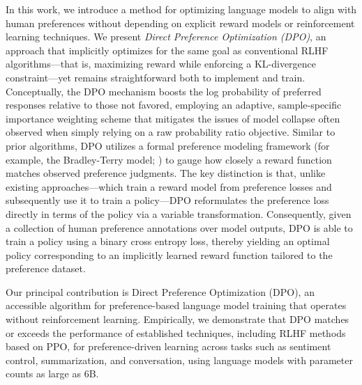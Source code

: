 In this work, we introduce a method for optimizing language models to align with human preferences without depending on explicit reward models or reinforcement learning techniques. We present \textit{{Direct Preference Optimization} (DPO)}, an approach that implicitly optimizes for the same goal as conventional RLHF algorithms—that is, maximizing reward while enforcing a KL-divergence constraint—yet remains straightforward both to implement and train. Conceptually, the DPO mechanism boosts the log probability of preferred responses relative to those not favored, employing an adaptive, sample-specific importance weighting scheme that mitigates the issues of model collapse often observed when simply relying on a raw probability ratio objective. Similar to prior algorithms, DPO utilizes a formal preference modeling framework (for example, the Bradley-Terry model; \cite{bradley1952rankanalysis}) to gauge how closely a reward function matches observed preference judgments. The key distinction is that, unlike existing approaches—which train a reward model from preference losses and subsequently use it to train a policy—DPO reformulates the preference loss directly in terms of the policy via a variable transformation. Consequently, given a collection of human preference annotations over model outputs, DPO is able to train a policy using a binary cross entropy loss, thereby yielding an optimal policy corresponding to an implicitly learned reward function tailored to the preference dataset.

Our principal contribution is Direct Preference Optimization (DPO), an accessible algorithm for preference-based language model training that operates without reinforcement learning. Empirically, we demonstrate that DPO matches or exceeds the performance of established techniques, including RLHF methods based on PPO, for preference-driven learning across tasks such as sentiment control, summarization, and conversation, using language models with parameter counts as large as 6B.

